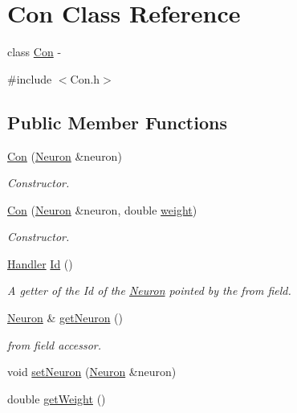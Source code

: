 \hypertarget{class_con}{
\section{Con Class Reference}
\label{class_con}
}


class \hyperlink{class_con}{Con} -\/  




{\ttfamily \#include $<$Con.h$>$}

\subsection*{Public Member Functions}
\begin{DoxyCompactItemize}
\item 
\hyperlink{class_con_a7fab3ece0e894f44f31d10a21b1d49c7}{Con} (\hyperlink{class_neuron}{Neuron} \&neuron)
\begin{DoxyCompactList}\small\item\em Constructor. \end{DoxyCompactList}\item 
\hyperlink{class_con_ad0b1e0d1eefd2296b23a2cfea04fc559}{Con} (\hyperlink{class_neuron}{Neuron} \&neuron, double \hyperlink{class_con_a7f46485ba5b41971ea38641f9e7d1be0}{weight})
\begin{DoxyCompactList}\small\item\em Constructor. \end{DoxyCompactList}\item 
\hyperlink{_a_m_o_r_e_8h_abc871abb71cff6655b8172ee7240b8ef}{Handler} \hyperlink{class_con_aee0a0b6c5beff6e227f9ebf33af2d209}{Id} ()
\begin{DoxyCompactList}\small\item\em A getter of the Id of the \hyperlink{class_neuron}{Neuron} pointed by the from field. \end{DoxyCompactList}\item 
\hyperlink{class_neuron}{Neuron} \& \hyperlink{class_con_a2209567efd330a58825b5068a421afe1}{getNeuron} ()
\begin{DoxyCompactList}\small\item\em from field accessor. \end{DoxyCompactList}\item 
void \hyperlink{class_con_ae372f50a253a424376959fb6ee8f083b}{setNeuron} (\hyperlink{class_neuron}{Neuron} \&neuron)
\item 
double \hyperlink{class_con_a385c5bf6eb9e2ffc94c5b427c287ccb2}{getWeight} ()

\end{DoxyCompactItemize}
